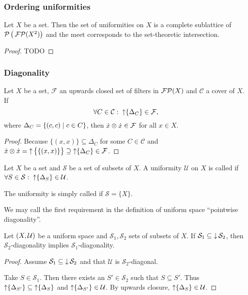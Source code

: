 \subsubsection{Ordering uniformities}
\begin{proposition} \label{latticeOfUniformities}
Let $X$ be a set. Then the set of uniformities on $X$ is a complete sublattice of $\operatorname{\mathcal{P}}\big(\operatorname{\mathcal{FP}}(X^2)\big)$ and the meet corresponds to the set-theoretic intersection.
\end{proposition}
\begin{proof}
TODO
\end{proof}

\subsubsection{Diagonality}
\begin{lemma}
Let $X$ be a set, $\mathcal{F}$ an upwards closed set of filters in $\operatorname{\mathcal{FP}}(X)$ and $\mathcal{C}$ a cover of $X$. If
\[ \forall C\in\mathcal{C}: \; \operatorname{\uparrow}\{\Delta_C\} \in \mathcal{F}, \]
where $\Delta_C = \left\{ (c,c) \;\middle|\; c\in C \right\}$, then $\dot{x}\otimes\dot{x}\in\mathcal{F}$ for all $x\in X$.
\end{lemma}
\begin{proof}
Because $\{(x,x)\}\subseteq \Delta_C$ for some $C\in\mathcal{C}$ and $\dot{x}\otimes\dot{x} = \operatorname{\uparrow} \big\{\{(x,x)\}\big\} \supseteq \operatorname{\uparrow}\{\Delta_C\} \in\mathcal{F}$.
\end{proof}

\begin{definition}
Let $X$ be a set and $\mathcal{S}$ be a set of subsets of $X$. A uniformity $\mathcal{U}$ on $X$ is called  if $\forall S\in\mathcal{S}: \; \operatorname{\uparrow}\{\Delta_S\} \in \mathcal{U}$.

The uniformity is simply called  if $\mathcal{S} = \{X\}$.
\end{definition}
We may call the first requirement in the definition of uniform space ``pointwise diagonality''.

\begin{lemma}
Let $\left( X,\mathcal{U} \right)$ be a uniform space and $\mathcal{S}_1, \mathcal{S}_2$ sets of subsets of $X$. If $\mathcal{S}_1 \subseteq \operatorname{\downarrow} \mathcal{S}_2$, then $\mathcal{S}_2$-diagonality implies $\mathcal{S}_1$-diagonality.
\end{lemma}
\begin{proof}
Assume $\mathcal{S}_1 \subseteq \operatorname{\downarrow} \mathcal{S}_2$ and that $\mathcal{U}$ is $\mathcal{S}_2$-diagonal.

Take $S\in \mathcal{S}_1$. Then there exists an $S'\in \mathcal{S}_2$ such that $S\subseteq S'$. Thus $\operatorname{\uparrow}\{\Delta_{S'}\} \subseteq \operatorname{\uparrow}\{\Delta_{S}\}$ and $\operatorname{\uparrow}\{\Delta_{S'}\}\in \mathcal{U}$. By upwards closure, $\operatorname{\uparrow}\{\Delta_{S}\} \in \mathcal{U}$.
\end{proof}

